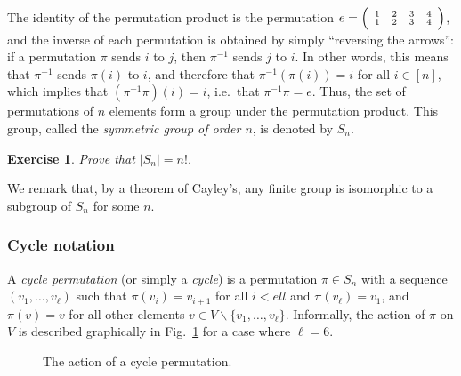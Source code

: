 \documentclass[a4paper]{book}
\theoremstyle{changebreak}                %
\newtheorem{ex}[result]{Exercise}
\begin{document}
The identity of the permutation product is the permutation
$e=\left({\scriptsize\begin{array}{cccc}1&2&3&4\\[-0.2em]1&2&3&4\end{array}}\right)$,
and the inverse of each permutation is
obtained by simply ``reversing the arrows'': if a permutation $\pi$
sends $i$ to $j$, then $\pi^{-1}$ sends $j$ to $i$. In other words,
this means that $\pi^{-1}$ sends $\pi(i)$ to $i$, and therefore that
$\pi^{-1}(\pi(i))=i$ for all $i\in[n]$, which implies that
$(\pi^{-1}\pi)(i)=i$, i.e.~that $\pi^{-1}\pi=e$. Thus, the set of
permutations of $n$ elements form a group under the
permutation product. This group, called the {\it symmetric group of
  order $n$}, is denoted by $S_n$.

\begin{ex}
\label{ex:Snsize}
Prove that $|S_n|=n!$.
\end{ex}

We remark that, by a theorem of Cayley's, any finite group is
isomorphic to a subgroup of $S_n$ for some $n$.

\subsubsection{Cycle notation}
\label{s:recursion:permutation:cycle}
A {\it cycle permutation} (or simply a {\it
  cycle}) is a permutation $\pi\in S_n$ with
a sequence $(v_1,\ldots,v_\ell)$ such that $\pi(v_i)=v_{i+1}$ for all
$i<ell$ and $\pi(v_\ell)=v_1$, and $\pi(v)=v$ for all other elements
$v\in V\smallsetminus\{v_1,\ldots,v_\ell\}$. Informally, the action of
$\pi$ on $V$ is described graphically in Fig.~\ref{fig:cycleperm} for
a case where $\ell=6$.
\begin{figure}[!ht]
\begin{center}
\end{center}
\caption{The action of a cycle permutation.}
\label{fig:cycleperm}
\end{figure}
\end{document}
